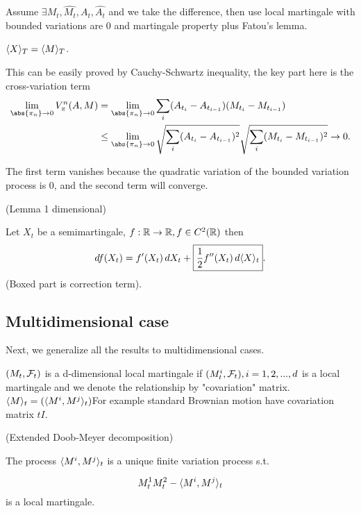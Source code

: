\pf Assume $\exists M_t, \hat{M_t}, A_t, \hat{A_t}$ and we take the difference, then use local martingale with bounded variations are 0 and martingale property plus Fatou's lemma.

\begin{lem} $\langle{X} \rangle_{T} = \langle{M} \rangle_{T}$.
\end{lem}

\pf This can be easily proved by Cauchy-Schwartz inequality, the key part here is the cross-variation term
\begin{align*}
    \biglim{\abs{\pi_n}\rightarrow 0}  V_\pi^n (A, M) &= \biglim{\abs{\pi_n}\rightarrow 0} \bigs{i}(A_{t_i} - A_{t_{i-1}})(M_{t_i} - M_{t_{i-1}}) \\
    &\leq \biglim{\abs{\pi_n}\rightarrow 0} \sqrt{\bigs{i}(A_{t_i} - A_{t_{i-1}})^2}\sqrt{\bigs{i}(M_{t_i} - M_{t_{i-1}})^2} \rightarrow 0.
\end{align*}

The first term vanishes because the quadratic variation of the bounded variation process is 0, and the second term will converge.

\begin{thm}{(\ito Lemma 1 dimensional)}

Let $X_t$ be a semimartingale, $f: \mathbb{R} \rightarrow \mathbb{R}, f\in C^2(\mathbb{R})$ then
\begin{equation*}
    \mathop{}\!d f(X_t) = f'(X_t) \mathop{}\!d X_t + \boxed{\frac{1}{2} f''(X_t) \mathop{}\!d \langle{X} \rangle_{t}}.
\end{equation*}
(Boxed part is \ito correction term).
\end{thm}

\subsection{Multidimensional case}
Next, we generalize all the results to multidimensional cases.

\begin{dfn}
$(M_t, \mathcal{F}_t)$ is a d-dimensional local martingale if $(M_t^i,\mathcal{F}_t), i = 1,2,...,d$ is a local martingale and we denote the relationship by "covariation" matrix. $\langle{M} \rangle_{t} = (\langle{M^i,M^j} \rangle_{t})$For example standard Brownian motion have covariation matrix $tI$.
\end{dfn}

\begin{thm}{(Extended Doob-Meyer decomposition)}

The process $\langle{M^i,M^j} \rangle_{t}$ is a unique finite variation process s.t. 

\begin{equation*}
    M_t^1 M_t^2 -\langle{M^i,M^j} \rangle_{t}
\end{equation*} is a local martingale.
\end{thm}

